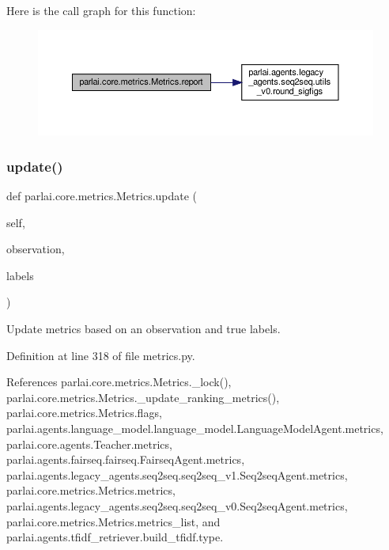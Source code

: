 Here is the call graph for this function\+:
\nopagebreak
\begin{figure}[H]
\begin{center}
\leavevmode
\includegraphics[width=350pt]{classparlai_1_1core_1_1metrics_1_1Metrics_ae96ffa8a0a1044cdcfcf6cf15fa139ee_cgraph}
\end{center}
\end{figure}
\mbox{\label{classparlai_1_1core_1_1metrics_1_1Metrics_ab1a5a659f2c5747af5d0b674dc647742}} 
\subsubsection{\texorpdfstring{update()}{update()}}
{\footnotesize\ttfamily def parlai.\+core.\+metrics.\+Metrics.\+update (\begin{DoxyParamCaption}\item[{}]{self,  }\item[{}]{observation,  }\item[{}]{labels }\end{DoxyParamCaption})}

\begin{DoxyVerb}Update metrics based on an observation and true labels.\end{DoxyVerb}
 

Definition at line 318 of file metrics.\+py.



References parlai.\+core.\+metrics.\+Metrics.\+\_\+lock(), parlai.\+core.\+metrics.\+Metrics.\+\_\+update\+\_\+ranking\+\_\+metrics(), parlai.\+core.\+metrics.\+Metrics.\+flags, parlai.\+agents.\+language\+\_\+model.\+language\+\_\+model.\+Language\+Model\+Agent.\+metrics, parlai.\+core.\+agents.\+Teacher.\+metrics, parlai.\+agents.\+fairseq.\+fairseq.\+Fairseq\+Agent.\+metrics, parlai.\+agents.\+legacy\+\_\+agents.\+seq2seq.\+seq2seq\+\_\+v1.\+Seq2seq\+Agent.\+metrics, parlai.\+core.\+metrics.\+Metrics.\+metrics, parlai.\+agents.\+legacy\+\_\+agents.\+seq2seq.\+seq2seq\+\_\+v0.\+Seq2seq\+Agent.\+metrics, parlai.\+core.\+metrics.\+Metrics.\+metrics\+\_\+list, and parlai.\+agents.\+tfidf\+\_\+retriever.\+build\+\_\+tfidf.\+type.



